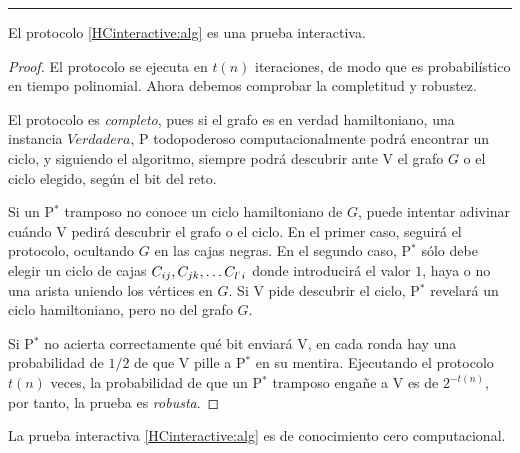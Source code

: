 \rule{\textwidth}{1pt}

\hfil

\begin{theorem}
	El protocolo \ref{HCinteractive:alg} es una prueba interactiva.
\end{theorem}

\begin{proof}
	El protocolo se ejecuta en $t(n)$ iteraciones, de modo que es probabilístico en tiempo polinomial. Ahora debemos comprobar la completitud y robustez.
	
	El protocolo es \textit{completo}, pues si el grafo es en verdad hamiltoniano, una instancia $Verdadera$, P todopoderoso computacionalmente podrá encontrar un ciclo, y siguiendo el algoritmo, siempre podrá descubrir ante V el grafo $G$ o el ciclo elegido, según el bit del reto.
	
	Si un P$^*$ tramposo no conoce un ciclo hamiltoniano de $G$, puede intentar adivinar cuándo V pedirá descubrir el grafo o el ciclo. En el primer caso, seguirá el protocolo, ocultando $G$ en las cajas negras. En el segundo caso, P$^*$ sólo debe elegir un ciclo de cajas  $C_{ij}, C_{jk}, \dots C_{l^`i}$ donde introducirá el valor $1$, haya o no una arista uniendo los vértices en $G$. Si V pide descubrir el ciclo, P$^*$ revelará un ciclo hamiltoniano, pero no del grafo $G$.
	
	Si P$^*$ no acierta correctamente qué bit enviará V, en cada ronda hay una probabilidad de $1/2$ de que V pille a P$^*$ en su mentira. Ejecutando el protocolo $t(n)$ veces, la probabilidad de que un P$^*$ tramposo engañe a V es de $2^{-t(n)}$, por tanto, la prueba es \textit{robusta}.
\end{proof}




\begin{theorem}
	La prueba interactiva \ref{HCinteractive:alg} es de conocimiento cero computacional.
\end{theorem}


